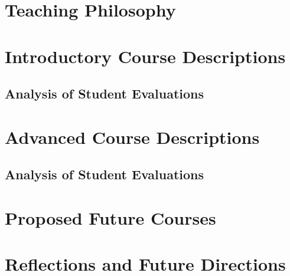 \documentclass[../main.tex]{subfiles}
\begin{document}
\section{Teaching Philosophy}

\begin{flushleft}

\end{flushleft}

\clearpage

\section{Introductory Course Descriptions}

\begin{flushleft}

\end{flushleft}

\clearpage

\subsection{Analysis of Student Evaluations}

\begin{flushleft}

\end{flushleft}

\clearpage

\section{Advanced Course Descriptions}

\begin{flushleft}

\end{flushleft}

\clearpage

\subsection{Analysis of Student Evaluations}

\begin{flushleft}

\end{flushleft}

\clearpage

\section{Proposed Future Courses}

\begin{flushleft}

\end{flushleft}

\clearpage

\section{Reflections and Future Directions}

\begin{flushleft}

\end{flushleft}
\end{document}
